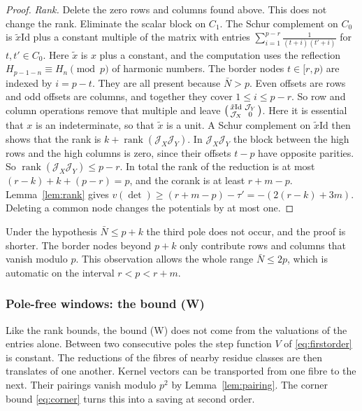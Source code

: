 \documentclass[11pt]{amsart}
\theoremstyle{definition}
\theoremstyle{remark}
\numberwithin{equation}{section}
\newcommand{\rank}{\operatorname{rank}}
\newcommand{\Id}{\mathrm{Id}}
\begin{document}
\begin{proof}
\emph{Rank.} Delete the zero rows and columns found above. This does not change the rank. Eliminate the scalar block on
$C_1$. The Schur complement on $C_0$ is $\tilde x\Id$ plus a constant multiple of the matrix with entries
$\sum_{i=1}^{p-r}\frac1{(t+i)(t'+i)}$ for $t,t'\in C_0$. Here $\tilde x$ is $x$ plus a constant, and the computation uses
the reflection $H_{p-1-n}\equiv H_n\pmod p$ of harmonic numbers. The border nodes $t\in[r,p)$ are indexed by $i=p-t$.
They are all present because $\bar N>p$. Even offsets are rows and odd offsets are columns, and together they cover
$1\le i\le p-r$. So row and column operations remove that multiple and leave
$\begin{psmallmatrix}\tilde x\Id&\mathcal J_Y\\ \mathcal J_X&0\end{psmallmatrix}$. Here it is essential that $x$ is an
indeterminate, so that $\tilde x$ is a unit. A Schur complement on $\tilde x\Id$ then shows that the rank is
$k+\rank(\mathcal J_X\mathcal J_Y)$. In $\mathcal J_X\mathcal J_Y$ the block between the high rows and the high columns is
zero, since their offsets $t-p$ have opposite parities. So $\rank(\mathcal J_X\mathcal J_Y)\le p-r$. In total the rank of
the reduction is at most $(r-k)+k+(p-r)=p$, and the corank is at least $r+m-p$. Lemma~\ref{lem:rank} gives
$v(\det)\ge(r+m-p)-\tau'=-(2(r-k)+3m)$. Deleting a common node changes the potentials by at most one.
\end{proof}

Under the hypothesis $\bar N\le p+k$ the third pole does not occur, and the proof is shorter. The border nodes beyond $p+k$
only contribute rows and columns that vanish modulo $p$. This observation allows the whole range $\bar N\le2p$, which is
automatic on the interval $r<p<r+m$.

\subsubsection{Pole-free windows: the bound (W)}\label{sssec:window}
Like the rank bounds, the bound (W) does not come from the valuations of the entries alone. Between two consecutive
poles the step function $V$ of \eqref{eq:firstorder} is constant. The reductions of the fibres of nearby residue classes
are then translates of one another. Kernel vectors can be transported from one fibre to the next. Their pairings vanish
modulo $p^2$ by Lemma~\ref{lem:pairing}. The corner bound \eqref{eq:corner} turns this into a saving at second order.
\end{document}
